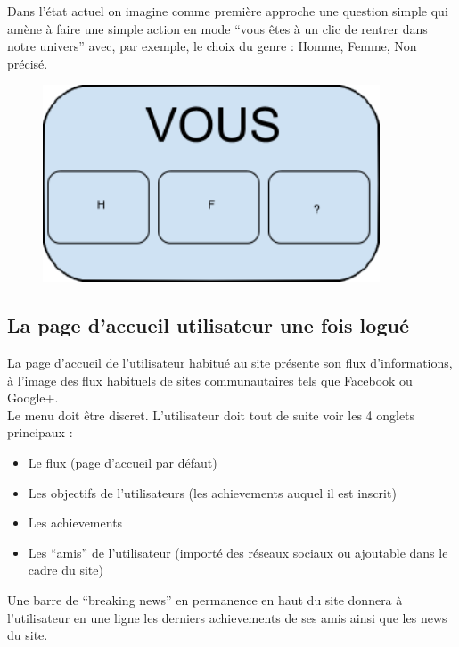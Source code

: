 \documentclass{life-fr}
\begin{document}
Dans l'état actuel on imagine comme première approche une question simple qui amène à faire une simple action en mode ``vous êtes à un clic de rentrer dans notre univers'' avec, par exemple, le choix du genre : Homme, Femme, Non précisé.

\begin{figure}[H]
  \begin{center}
    \includegraphics[width=10cm]{img/vous.png}
  \end{center}
\end{figure}

\subsection{La page d'accueil utilisateur une fois logué}

La page d'accueil de l'utilisateur habitué au site présente son flux d'informations, à l'image des flux habituels de sites communautaires tels que Facebook ou Google+. \\

Le menu doit être discret. L'utilisateur doit tout de suite voir les 4 onglets principaux :

\begin{itemize}
  \item Le flux (page d'accueil par défaut)
  \item Les objectifs de l'utilisateurs (les achievements auquel il est inscrit)
  \item Les achievements
  \item Les “amis” de l'utilisateur (importé des réseaux sociaux ou ajoutable dans le cadre du site)
\end{itemize}

Une barre de “breaking news” en permanence en haut du site donnera à l'utilisateur en une ligne les derniers achievements de ses amis ainsi que les news du site.
\end{document}
